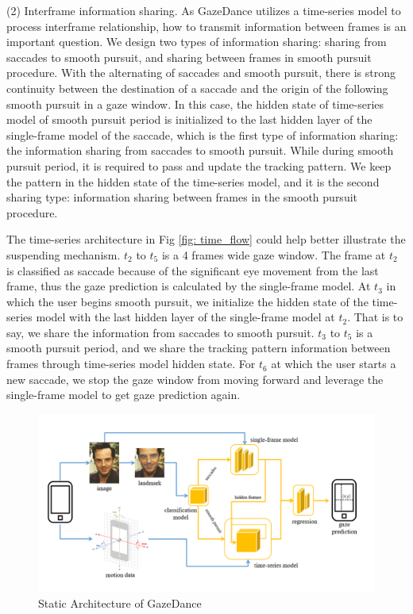 \documentclass[acmlarge]{acmart}
\begin{document}
(2) Interframe information sharing. As GazeDance utilizes a time-series model to process interframe relationship, how to transmit information between frames is an important question. We design two types of information sharing: sharing from saccades to smooth pursuit, and sharing between frames in smooth pursuit procedure. With the alternating of saccades and smooth pursuit\cite{Neuroscience2001}, there is strong continuity between the destination of a saccade and the origin of the following smooth pursuit in a gaze window. In this case, the hidden state of time-series model of smooth pursuit period is initialized to the last hidden layer of the single-frame model of the saccade, which is the first type of information sharing: the information sharing from saccades to smooth pursuit. While during smooth pursuit period, it is required to pass and update the tracking pattern. We keep the pattern in the hidden state of the time-series model, and it is the second sharing type: information sharing between frames in the smooth pursuit procedure.


The time-series architecture in Fig \ref{fig: time_flow} could help better illustrate the suspending mechanism. $t_2$ to $t_5$ is a 4 frames wide gaze window. The frame at $t_2$ is classified as saccade because of the significant eye movement from the last frame, thus the gaze prediction is calculated by the single-frame model. At $t_3$ in which the user begins smooth pursuit, we initialize the hidden state of the time-series model with the last hidden layer of the single-frame model at $t_2$. That is to say, we share the information from saccades to smooth pursuit. $t_3$ to $t_5$ is a smooth pursuit period, and we share the tracking pattern information between frames through time-series model hidden state. For $t_6$ at which the user starts a new saccade, we stop the gaze window from moving forward and leverage the single-frame model to get gaze prediction again.


\begin{figure}
  \centering
  \includegraphics[scale=0.6]{pictures/architecture.jpg}
  \caption{Static Architecture of GazeDance}
  \label{fig:architecture}
\end{figure}
\end{document}
